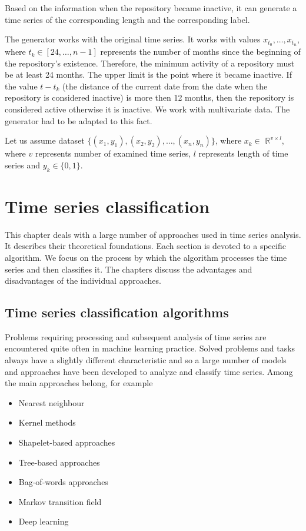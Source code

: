 \documentclass[thesis=M,english]{FITthesis}[2019/12/23]
\begin{document}
Based on the information when the repository became inactive, it can generate a time series of the corresponding length and the corresponding label. 

The generator works with the original time series. It works with values $x_{t_0},\dots,x_{t_n}$, where $t_k \in {[24,\dots,n-1]}$ represents the number of months since the beginning of the repository's existence. Therefore, the minimum activity of a repository must be at least 24 months. The upper limit is the point where it became inactive. If the value $t - t_k$ (the distance of the current date from the date when the repository is considered inactive) is more then 12 months, then the repository is considered active otherwise it is inactive. 
We work with multivariate data. The generator had to be adapted to this fact.

Let us assume dataset $\{{(x_1,y_1), (x_2,y_2),\dots,(x_n,y_n)}\}$, where $x_k\in$ $\mathbb{R}^{v \times l}$, where $v$ represents number of examined time series, $l$ represents length of time series and $y_k \in \{0,1\}$. 
\chapter{Time series classification}
\label{label:Timeseries_classification}
This chapter deals with a large number of approaches used in time series analysis. It describes their theoretical foundations. Each section is devoted to a specific algorithm. We focus on the process by which the algorithm processes the time series and then classifies it. The chapters discuss the advantages and disadvantages of the individual approaches.

\section{Time series classification algorithms}
Problems requiring processing and subsequent analysis of time series are encountered quite often in machine learning practice. Solved problems and tasks always have a slightly different characteristic and so a large number of models and approaches have been developed to analyze and classify time series.
Among the main approaches belong, for example

\begin{itemize}
		\item Nearest neighbour 
		\item Kernel methods
		\item Shapelet-based approaches
		\item Tree-based approaches
		\item Bag-of-words approaches
		\item Markov transition field
		\item Deep learning
	\end{itemize}
\end{document}
